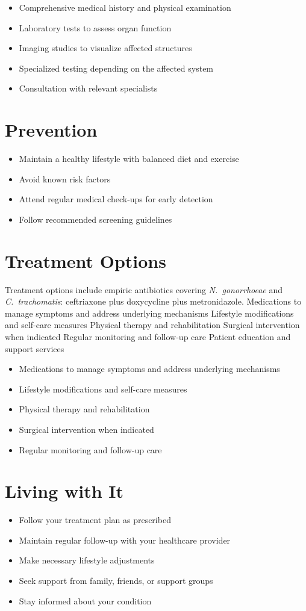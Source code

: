\begin{itemize}[noitemsep]
  \item Comprehensive medical history and physical examination
  \item Laboratory tests to assess organ function
  \item Imaging studies to visualize affected structures
  \item Specialized testing depending on the affected system
  \item Consultation with relevant specialists
\end{itemize}
\section{Prevention}
\begin{itemize}[noitemsep]
  \item Maintain a healthy lifestyle with balanced diet and exercise
  \item Avoid known risk factors
  \item Attend regular medical check-ups for early detection
  \item Follow recommended screening guidelines
\end{itemize}
\section{Treatment Options}
Treatment options include empiric antibiotics covering \textit{N.~gonorrhoeae} and \textit{C.~trachomatis}: ceftriaxone plus doxycycline plus metronidazole. Medications to manage symptoms and address underlying mechanisms Lifestyle modifications and self-care measures Physical therapy and rehabilitation Surgical intervention when indicated Regular monitoring and follow-up care Patient education and support services

\begin{itemize}[noitemsep]
  \item Medications to manage symptoms and address underlying mechanisms
  \item Lifestyle modifications and self-care measures
  \item Physical therapy and rehabilitation
  \item Surgical intervention when indicated
  \item Regular monitoring and follow-up care
\end{itemize}
\section{Living with It}
\begin{itemize}[noitemsep]
  \item Follow your treatment plan as prescribed
  \item Maintain regular follow-up with your healthcare provider
  \item Make necessary lifestyle adjustments
  \item Seek support from family, friends, or support groups
  \item Stay informed about your condition
\end{itemize}
